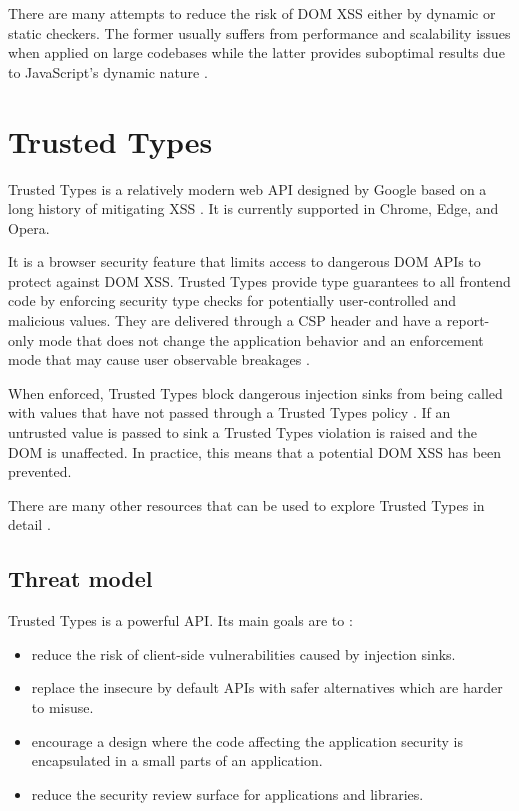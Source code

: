 There are many attempts to reduce the risk of DOM XSS either by dynamic or static checkers. The
former usually suffers from performance and scalability issues when applied on large codebases while
the latter provides suboptimal results due to JavaScript's dynamic nature
\cite{tt_web_framework_paper} \cite{owasp_xss_cheatsheet}.

\section{Trusted Types}

Trusted Types is a relatively modern web API designed by Google based on a long history of
mitigating XSS \cite{tt_design_history}. It is currently supported in Chrome, Edge, and Opera.

It is a browser security feature that limits access to dangerous DOM APIs to protect against DOM
XSS. Trusted Types provide type guarantees to all frontend code by enforcing security type checks
for potentially user-controlled and malicious values. They are delivered through a CSP header and
have a report-only mode that does not change the application behavior and an enforcement mode that
may cause user observable breakages \cite{tt_background}.

When enforced, Trusted Types block dangerous injection sinks from being called with values that have
not passed through a Trusted Types policy \cite{tt_background}. If an untrusted value is passed to
sink a Trusted Types violation is raised and the DOM is unaffected. In practice, this means that a
potential DOM XSS has been prevented.

There are many other resources that can be used to explore Trusted Types in detail
\cite{tt_resources}.

\subsection{Threat model}

Trusted Types is a powerful API. Its main goals are to \cite{tt_spec:goals}:

\begin{itemize}
  \item reduce the risk of client-side vulnerabilities caused by injection sinks.
  \item replace the insecure by default APIs with safer alternatives which are harder to misuse.
  \item encourage a design where the code affecting the application security is encapsulated in a
        small parts of an application.
  \item reduce the security review surface for applications and libraries.
\end{itemize}

